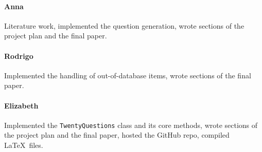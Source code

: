 \documentclass[11pt,a4paper]{article}
\begin{document}
\paragraph{Anna} Literature work, implemented the question generation, wrote sections of the project plan and the final paper.

\paragraph{Rodrigo} Implemented the handling of out-of-database items, wrote sections of the final paper.

\paragraph{Elizabeth} Implemented the \texttt{TwentyQuestions} class and its core methods, wrote sections of the project plan and the final paper, hosted the GitHub repo, compiled \LaTeX\ files.
\end{document}
